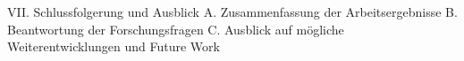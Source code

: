 
VII. Schlussfolgerung und Ausblick
	A. Zusammenfassung der Arbeitsergebnisse
	B. Beantwortung der Forschungsfragen
	C. Ausblick auf mögliche Weiterentwicklungen und Future Work
